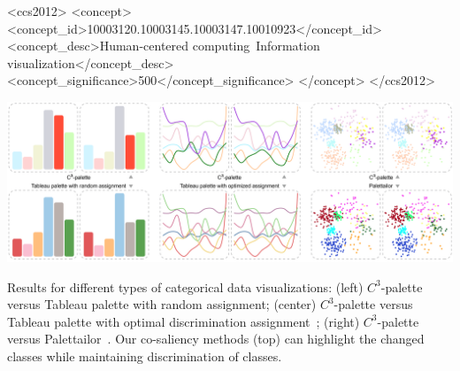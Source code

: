\documentclass[manuscript,screen,review]{acmart}
\begin{document}
\begin{CCSXML}
<ccs2012>
<concept>
<concept_id>10003120.10003145.10003147.10010923</concept_id>
<concept_desc>Human-centered computing~Information visualization</concept_desc>
<concept_significance>500</concept_significance>
</concept>
</ccs2012>
\end{CCSXML}



\begin{teaserfigure}
  \includegraphics[width=\textwidth]{teaser7}
  \caption{
  Results for different types of categorical data visualizations: (left) $C^3$-palette versus Tableau palette with random assignment; (center) $C^3$-palette  versus
Tableau palette with optimal discrimination assignment~\cite{Wang2018}; (right) $C^3$-palette versus Palettailor~\cite{Lu21}. Our co-saliency methods (top) can highlight the changed classes while
maintaining discrimination of classes.}
  \label{fig:teaser}
\end{teaserfigure}

\maketitle





%



\end{document}
